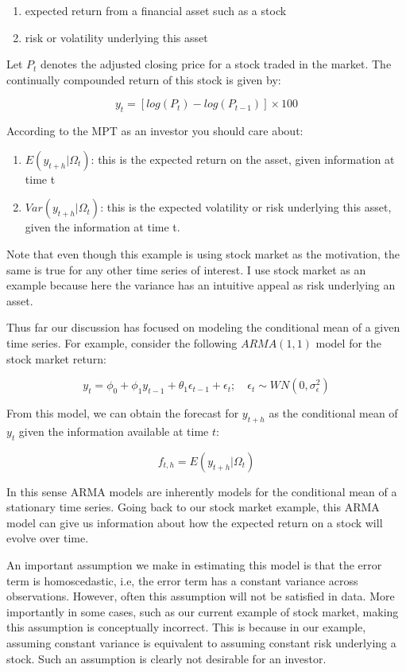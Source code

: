 \documentclass[]{book}
\providecommand{\tightlist}{%
  \setlength{\itemsep}{0pt}\setlength{\parskip}{0pt}}
\theoremstyle{definition}
\theoremstyle{definition}
\theoremstyle{definition}
\theoremstyle{remark}
\begin{document}
\begin{enumerate}
\def\labelenumi{\arabic{enumi}.}
\tightlist
\item
  expected return from a financial asset such as a stock
\item
  risk or volatility underlying this asset
\end{enumerate}

Let \(P_t\) denotes the adjusted closing price for a stock traded in the market. The continually compounded return of this stock is given by:

\[y_t=[log(P_t)-log(P_{t-1})]\times 100\]

According to the MPT as an investor you should care about:

\begin{enumerate}
\def\labelenumi{\arabic{enumi}.}
\tightlist
\item
  \(E(y_{t+h}|\Omega_t)\): this is the expected return on the asset, given information at time t
\item
  \(Var(y_{t+h}|\Omega_t)\): this is the expected volatility or risk underlying this asset, given the information at time t.
\end{enumerate}

Note that even though this example is using stock market as the motivation, the same is true for any other time series of interest. I use stock market as an example because here the variance has an intuitive appeal as risk underlying an asset.

Thus far our discussion has focused on modeling the conditional mean of a given time series. For example, consider the following \(ARMA(1,1)\) model for the stock market return:

\[y_t=\phi_0 + \phi_1 y_{t-1} + \theta_1 \epsilon_{t-1} + \epsilon_t ; \quad \epsilon_t\sim WN(0, \sigma^2_\epsilon )\]

From this model, we can obtain the forecast for \(y_{t+h}\) as the conditional mean of \(y_t\) given the information available at time \(t\):

\[f_{t,h}=E(y_{t+h}|\Omega_t)\]

In this sense ARMA models are inherently models for the conditional mean of a stationary time series. Going back to our stock market example, this ARMA model can give us information about how the expected return on a stock will evolve over time.

An important assumption we make in estimating this model is that the error term is homoscedastic, i.e, the error term has a constant variance across observations. However, often this assumption will not be satisfied in data. More importantly in some cases, such as our current example of stock market, making this assumption is conceptually incorrect. This is because in our example, assuming constant variance is equivalent to assuming constant risk underlying a stock. Such an assumption is clearly not desirable for an investor.
\end{document}
